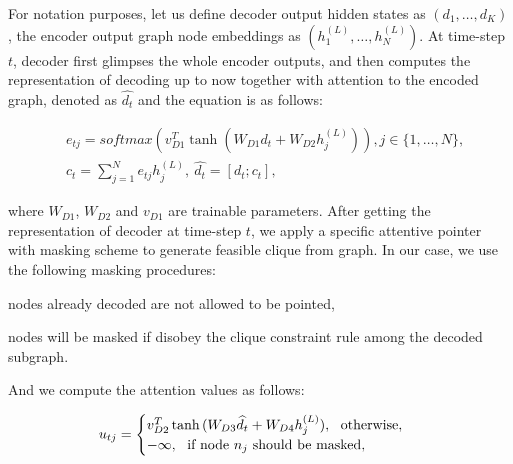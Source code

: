 For notation purposes, let us define decoder output hidden states as $(d_1,\dots,d_K)$,
the encoder output graph node embeddings as $(h_1^{(L)},\dots,h_N^{(L)})$.
At time-step $t$, decoder first glimpses \cite{vinyals2015order} the whole encoder outputs,
and then computes the representation of decoding up to now together with attention to the encoded graph, denoted as $\widehat{d_t}$ and the equation is as follows:
\begin{small}
\begin{eqnarray}
\label{eq:glimpse}
&e_{tj}=softmax(v_{D1}^T\tanh(W_{D1}d_t+W_{D2}h_j^{(L)})),j\in\{1,\dots,N\}, \nonumber\\
&c_t=\sum_{j=1}^{N}e_{tj}h_j^{(L)},\ \widehat{d_t}=[d_t;c_t],
\end{eqnarray}
\end{small}
where $W_{D1}$, $W_{D2}$ and $v_{D1}$ are trainable parameters.
After getting the representation of decoder at time-step $t$,
we apply a specific attentive pointer with masking scheme to generate feasible clique from graph.
In our case, we use the following masking procedures: 
\begin{inparaenum}
\item nodes already decoded are not allowed to be pointed,
\item nodes will be masked if disobey the clique constraint rule among the decoded subgraph.
\end{inparaenum}
And we compute the attention values as follows:
\begin{small}
\begin{equation}
\label{eq:pointer}
u_{tj}=
\begin{cases}
v_{D2}^T\tanh{(W_{D3}\widehat{d_t}+W_{D4}h_j^{(L)})},\ \ \text{otherwise},  \\
-\infty,\ \  \text{if node $n_j$ should be masked,}
\end{cases} \\
\end{equation}
\end{small}
